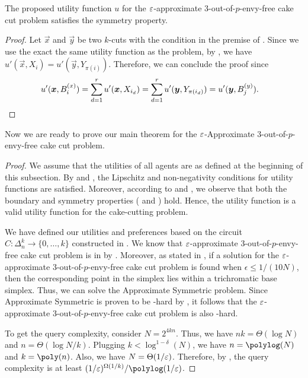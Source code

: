 \begin{claim}\label{clm:first-symmetric-hold-2}
    The proposed utility function $u$ for the $\eps$-approximate 3-out-of-$p$-envy-free cake cut problem satisfies the symmetry property.    
\end{claim}

\begin{proof}
    Let $\vec{x}$ and $\vec{y}$ be two $k$-cuts with the condition in the premise of . Since we use the exact the same utility function as the \mccs{} problem, by , we have $u'(\vec{x}, X_i) = u'(\vec{y}, Y_{\pi(i)})$. Therefore, we can conclude the proof since
    \begin{align*}
        u'(\vec{x}, B^{(x)}_i) = \sum_{d=1}^r u'(\vec{x}, X_{i_d}) = \sum_{d=1}^r u'(\vec{y}, Y_{\pi(i_d)}) = u'(\vec{y}, B^{(y)}_j). & \qedhere
    \end{align*}
\end{proof}





Now we are ready to prove our main theorem for the $\eps$-Approximate 3-out-of-$p$-envy-free cake cut problem.


\cakecuttingtheorem*

\begin{proof}

We assume that the utilities of all agents are as defined at the beginning of this subsection. By  and , the Lipschitz and non-negativity conditions for utility functions are satisfied. Moreover, according to  and , we observe that both the boundary and symmetry properties ( and ) hold. Hence, the utility function is a valid utility function for the cake-cutting problem.


We have defined our utilities and preferences based on the circuit $C: \Delta^k_n \rightarrow \{0, \ldots, k\}$ constructed in . We know that $\eps$-approximate 3-out-of-$p$-envy-free cake cut problem is in \PPAD{} by \cite{DBLP:journals/ior/DengQS12}. Moreover, as stated in , if a solution for the $\eps$-approximate 3-out-of-$p$-envy-free cake cut problem is found when $\epsilon \leq 1/(10N)$, then the corresponding point in the simplex lies within a trichromatic base simplex. Thus, we can solve the \outofk Approximate Symmetric \Sperner problem. Since \outofk Approximate Symmetric \Sperner is proven to be \PPAD-hard by , it follows that the $\eps$-approximate 3-out-of-$p$-envy-free cake cut problem is also \PPAD-hard.


To get the query complexity, consider $N = 2^{4kn}$. Thus, we have $nk = \Theta(\log N)$ and $n = \Theta(\log N/ k)$. Plugging $k < \log^{1-\delta}(N)$, we have $n = \polylog(N)$ and $k = \poly(n)$. Also, we have $N = \Theta(1/\eps)$. Therefore, by , the query complexity is at least $(1/\eps)^{\Omega(1/k)}/\polylog(1/\eps)$.
\end{proof}




